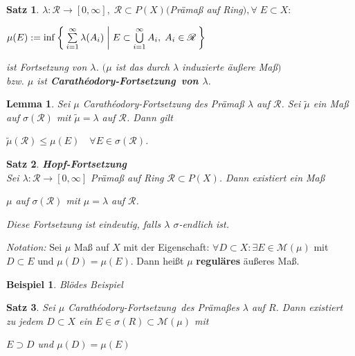 \documentclass[11pt]{memoir}
\theoremstyle{changebreak}
\newtheorem{Beispiel}{Beispiel}[chapter]
\newtheorem{Lemma}{Lemma}[chapter]
\newtheorem{Satz}{Satz}[chapter]
\newcommand{\cara}{Carathéodory-Fortsetzung}
\begin{document}
\begin{Satz}
$\lambda: \mathscr R \rightarrow [0, \infty], \; \mathscr R \subset P(X) ($Prämaß auf Ring$), \forall \;E \subset X:$ \\
\begin{center}
$\mu(E):= \inf\Set{ \sum\limits_{i=1}^{\infty} \lambda(A_i) | E \subset \bigcup\limits_{i=1}^{\infty} A_i, \; A_i \in \mathscr{R}}$
\end{center}
ist Fortsetzung von $\lambda$. $(\mu$ ist das durch $\lambda$ induzierte äußere Maß$)$ \\
bzw. $\mu$ ist \textbf{\cara\, von $\lambda$}.
\end{Satz}

\begin{Lemma}
Sei $\mu$ \cara\; des Prämaß $\lambda$ auf $\mathscr R$. Sei $\tilde{\mu}$ ein Maß auf $\sigma(\mathscr R)$ mit $\tilde{\mu} = \lambda$ auf $ \mathscr R$. Dann gilt 
\begin{center}
	$\tilde{\mu}(\mathscr R) \leq \mu(E)\quad \forall E \in \sigma(\mathscr R)$.
\end{center}
\end{Lemma}

\begin{Satz} \emph{\textbf{Hopf-Fortsetzung} }\\
Sei $\lambda: \mathscr R \rightarrow [0, \infty]$ Prämaß auf Ring $\mathscr R \subset P(X)$. Dann existiert ein Maß 
\begin{center}
	$\mu$ auf $\sigma(\mathscr R)$ mit $\mu =\lambda$ auf $\mathscr R$.
\end{center}	
Diese Fortsetzung ist \emph{eindeutig}, falls $\lambda$ $\sigma$-endlich ist.
\end{Satz}

\emph{Notation:}
Sei $\mu$ Maß auf $X$ mit der Eigenschaft: $\forall D \subset X: \exists E \in \mathscr{M}(\mu)$ mit $D \subset E$ und $\mu(D) = \mu(E)$. Dann heißt $\mu$ \textbf{reguläres} äußeres Maß.

\begin{Beispiel}
Blödes Beispiel
\end{Beispiel}

\begin{Satz}
Sei $\mu$ \cara\, des Prämaßes $\lambda$ auf $R$. Dann existiert zu jedem $D \subset X$ ein $E \in \sigma(R) \subset \mathscr M(\mu)$ mit 
\begin{center}
	$E \supset D$ \quad und \quad $\mu(D) = \mu(E)$
\end{center}
\end{Satz}
\end{document}

